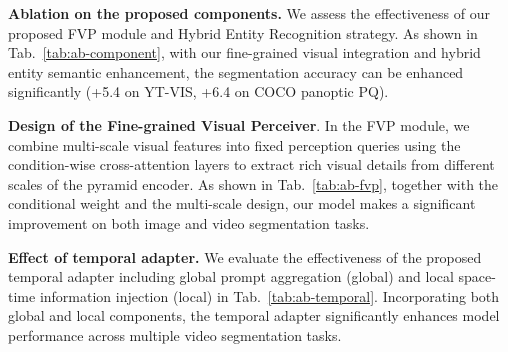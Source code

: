 \begin{table}[t]
  \centering
  \caption{ Ablation on the Fine-grained Visual Perceiver design. CW denotes the Conditional Weight illustrated in Sec.~\ref{subsec:fvp}, and Scale denotes the total scale in the proposed FVP module.
  }
\vspace{-3mm}
  
\label{tab:ab-fvp}
\end{table}

\noindent\textbf{Ablation on the proposed components.} We assess the effectiveness of our proposed FVP module and Hybrid Entity Recognition strategy.
As shown in Tab.~\ref{tab:ab-component}, with our fine-grained visual integration and hybrid entity semantic enhancement, the segmentation accuracy can be enhanced significantly (+5.4 on YT-VIS, +6.4 on COCO panoptic PQ).

\noindent\textbf{Design of the Fine-grained Visual Perceiver}. In the FVP module, we combine multi-scale visual features into fixed perception queries using the condition-wise cross-attention layers to extract rich visual details from different scales of the pyramid encoder. 
As shown in Tab.~\ref{tab:ab-fvp}, together with the conditional weight and the multi-scale design, our model makes a significant improvement on both image and video segmentation tasks.

\noindent\textbf{Effect of temporal adapter.} We evaluate the effectiveness of the proposed temporal adapter including global prompt aggregation (global) and local space-time information injection (local) in Tab.~\ref{tab:ab-temporal}.
Incorporating both global and local components, the temporal adapter significantly enhances model performance across multiple video segmentation tasks.

